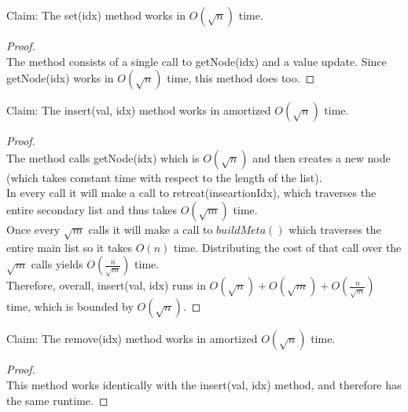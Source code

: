 \documentclass[10pt]{article}
\begin{document}
Claim: The set(idx) method works in $O(\sqrt{n})$ time.
\begin{proof}
	$ $\\
	The method consists of a single call to getNode(idx) and a value update. Since getNode(idx) works in $O(\sqrt{n})$ time, this method does too.
\end{proof}

Claim: The insert(val, idx) method works in amortized $O(\sqrt{n})$ time.
\begin{proof}
	$ $\\
	The method calls getNode(idx) which is $O(\sqrt{n})$ and then creates a new node (which takes constant time with respect to the length of the list).\\
	In every call it will make a call to retreat(inseartionIdx), which traverses the entire secondary list and thus takes $O(\sqrt{m})$ time.\\
	Once every $\sqrt{m}$ calls it will make a call to $buildMeta()$ which traverses the entire main list so it takes $O(n)$ time. Distributing the cost of that call over the $\sqrt{m}$ calls yields $O(\frac{n}{\sqrt{m}})$ time.\\
	Therefore, overall, insert(val, idx) runs in $O(\sqrt{n}) + O(\sqrt{m}) + O(\frac{n}{\sqrt{m}})$ time, which is bounded by $O(\sqrt{n})$.
\end{proof}

Claim: The remove(idx) method works in amortized $O(\sqrt{n})$ time.
\begin{proof}
	$ $\\
	This method works identically with the insert(val, idx) method, and therefore has the same runtime.
\end{proof}
\end{document}
